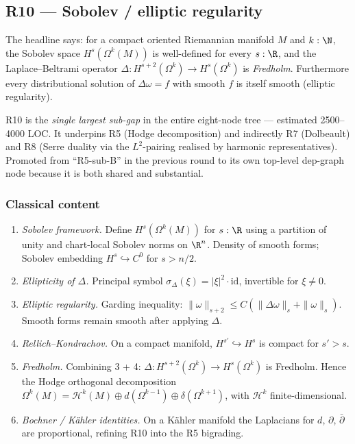 \subsection{R10 --- Sobolev / elliptic regularity}
\label{subsec:gap-R10-sobolev-elliptic}

The headline says: for a compact oriented Riemannian manifold \(M\)
and \(k : \N\), the Sobolev space \(H^{s}(\Omega^{k}(M))\) is
well-defined for every \(s : \R\), and the Laplace--Beltrami operator
\(\Delta : H^{s+2}(\Omega^{k}) \to H^{s}(\Omega^{k})\) is
\emph{Fredholm}.  Furthermore every distributional solution of
\(\Delta\omega = f\) with smooth \(f\) is itself smooth (elliptic
regularity).

R10 is the \emph{single largest sub-gap} in the entire eight-node
tree --- estimated 2500--4000 LOC.  It underpins R5 (Hodge decomposition)
and indirectly R7 (Dolbeault) and R8 (Serre duality via the
\(L^{2}\)-pairing realised by harmonic representatives).  Promoted
from ``R5-sub-B'' in the previous round to its own top-level
dep-graph node because it is both shared and substantial.

\subsubsection*{Classical content}

\begin{enumerate}
\item \emph{Sobolev framework.}  Define \(H^{s}(\Omega^{k}(M))\) for
  \(s : \R\) using a partition of unity and chart-local Sobolev norms
  on \(\R^{n}\).  Density of smooth forms; Sobolev embedding
  \(H^{s} \hookrightarrow C^{0}\) for \(s > n/2\).
\item \emph{Ellipticity of \(\Delta\).}  Principal symbol
  \(\sigma_{\Delta}(\xi) = |\xi|^{2} \cdot \mathrm{id}\), invertible
  for \(\xi \neq 0\).
\item \emph{Elliptic regularity.}  Garding inequality:
  \(\|\omega\|_{s+2} \leq C(\|\Delta\omega\|_{s} + \|\omega\|_{s})\).
  Smooth forms remain smooth after applying \(\Delta\).
\item \emph{Rellich--Kondrachov.}  On a compact manifold,
  \(H^{s'} \hookrightarrow H^{s}\) is compact for \(s' > s\).
\item \emph{Fredholm.}  Combining 3 + 4:
  \(\Delta : H^{s+2}(\Omega^{k}) \to H^{s}(\Omega^{k})\) is Fredholm.
  Hence the Hodge orthogonal decomposition
  \(\Omega^{k}(M) = \mathcal{H}^{k}(M) \oplus d(\Omega^{k-1}) \oplus
  \delta(\Omega^{k+1})\), with \(\mathcal{H}^{k}\) finite-dimensional.
\item \emph{Bochner / K\"ahler identities.}  On a K\"ahler manifold the
  Laplacians for \(d\), \(\partial\), \(\bar\partial\) are
  proportional, refining R10 into the R5 bigrading.
\end{enumerate}

